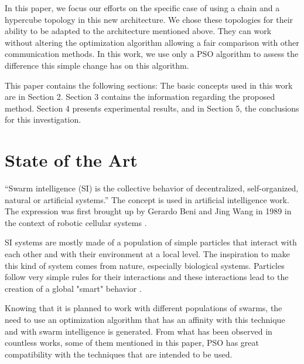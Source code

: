 \documentclass[runningheads]{llncs}
\begin{document}
In this paper, we focus our efforts on the specific case of using a
chain and a hypercube topology in this new architecture. We chose
these topologies for their ability to be adapted to the architecture
mentioned above. They can work without altering the optimization
algorithm allowing a fair comparison with other communication
methods. In this work, we use only a PSO algorithm to assess the
difference this simple change has on this algorithm.

This paper contains the following sections: The basic concepts used in this work are in Section 2. Section 3 contains the information regarding the proposed method. Section 4 presents experimental results, and in Section 5, the conclusions for this investigation.

\section{State of the Art}


“Swarm intelligence (SI) is the collective behavior of decentralized, self-organized, natural or artificial systems.” The concept is used in artificial intelligence work. The expression was first brought up by Gerardo Beni and Jing Wang in 1989 in the context of robotic cellular systems \cite{b4}. 

SI systems are mostly made of a population of simple particles that interact with each other and with their environment at a local level. The inspiration to make this kind of system comes from nature, especially biological systems. Particles follow very simple rules for their interactions and these interactions lead to the creation of a global "smart" behavior \cite{b5}.

Knowing that it is planned to work with different populations of swarms, the need to use an optimization algorithm that has an affinity with this technique and with swarm intelligence is generated. From what has been observed in countless works, some of them mentioned in this paper, PSO has great compatibility with the techniques that are intended to be used.
\end{document}
